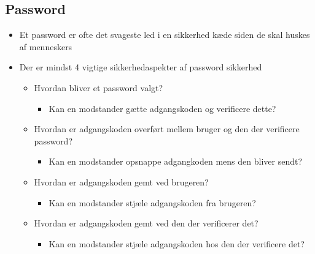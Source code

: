 \documentclass[a4, english]{article}
\begin{document}
\subsection{Password}
\begin{itemize}
	\item Et password er ofte det svageste led i en sikkerhed kæde siden de skal huskes af menneskers 
  \item Der er mindst 4 vigtige sikkerhedaspekter af password sikkerhed  
  \begin{itemize}
  	\item Hvordan bliver et password valgt?
    \begin{itemize}
    	\item Kan en modstander gætte adgangskoden og verificere dette?  
    \end{itemize}
    \item Hvordan er adgangskoden overført mellem bruger og den der verificere password? 
    \begin{itemize}
    	\item Kan en modstander opsnappe adgangkoden mens den bliver sendt?
    \end{itemize}
    \item Hvordan er adgangskoden gemt ved brugeren? 
    \begin{itemize}
    	\item Kan en modstander stjæle adgangskoden fra brugeren? 
    \end{itemize}
    \item Hvordan er adgangskoden gemt ved den der verificerer det? 
    \begin{itemize}
    	\item Kan en modstander stjæle adgangskoden hos den der verificere det? 
    \end{itemize}
  \end{itemize}
\end{itemize}
\end{document}
